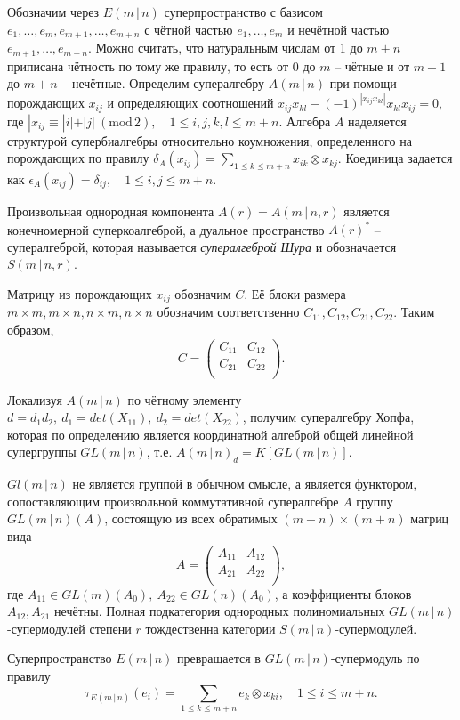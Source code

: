 
Обозначим через $ E(m\,|\,n) $ суперпространство с базисом $ e_1, \ldots, e_m, e_{m + 1}, \ldots, e_{m + n} $ 
с чётной частью $ e_1, \ldots, e_m $ и нечётной частью $ e_{m + 1}, \ldots, e_{m + n} $. 
Можно считать, что натуральным числам от 1 до $m + n$ приписана чётность по тому же правилу, то есть от 0 до $m$ -- чётные и от $m + 1$ до $m + n$ -- нечётные.
Определим супералгебру $ A(m\,|\,n) $ при помощи порождающих $x_{ij}$ и определяющих соотношений $x_{ij} x_{kl} - (-1)^{|x_{ij} x_{kl}|} x_{kl} x_{ij} = 0 $, 
где $ |x_{ij} \equiv |i| + |j| ~(\mbox{mod}\,2), \quad 1 \leqslant i, j, k, l \leqslant m + n $. 
Алгебра $A$ наделяется структурой супербиалгебры относительно коумножения, определенного на порождающих по правилу 
$ \delta_A (x_{ij}) = \sum\limits_{1 \leqslant k \leqslant m + n} x_{ik} \otimes x_{kj} $. 
Коединица задается как $ \epsilon_A (x_{ij}) = \delta_{ij}, \quad 1 \leqslant i, j \leqslant m + n $. 

Произвольная однородная компонента $ A(r) = A(m\,|\,n, r) $ является конечномерной суперкоалгеброй, а дуальное пространство $ A(r)^* $ -- супералгеброй, 
которая называется \textit{супералгеброй Шура} и обозначается $ S(m\,|\,n, r) $.

Матрицу из порождающих $x_{ij}$ обозначим $C$. Её блоки размера $ m \times m, m \times n, n \times m, n \times n $ обозначим соответственно 
$ C_{11}, C_{12}, C_{21}, C_{22} $. Таким образом,
$$ C = 
\begin{pmatrix}
C_{11} & C_{12} \\
C_{21} & C_{22} \\
\end{pmatrix}.
$$

Локализуя $ A(m\,|\,n) $ по чётному элементу $ d = d_1 d_2, \: d_1 = det(X_{11}), \: d_2 = det(X_{22}) $, получим супералгебру Хопфа, 
которая по определению является координатной алгеброй общей линейной супергруппы $ GL(m\,|\,n) $, т.е. $ A(m\,|\,n)_d = K[GL(m\,|\,n)] $.

$ Gl(m\,|\,n) $ не является группой в обычном смысле, а является функтором, сопоставляющим произвольной коммутативной супералгебре $A$
группу $ GL(m\,|\,n)(A) $, состоящую из всех обратимых $ (m + n) \times (m + n) $ матриц вида
$$ A = 
\begin{pmatrix}
A_{11} & A_{12} \\
A_{21} & A_{22} \\
\end{pmatrix},
$$
где $ A_{11} \in GL(m)(A_0), \: A_{22} \in GL(n)(A_0)$, а коэффициенты блоков $ A_{12}, A_{21} $ нечётны. 
Полная подкатегория однородных полиномиальных $GL(m\,|\,n)$-супермодулей степени $r$ тождественна категории 
$ S(m\,|\,n) $-супермодулей.

Суперпространство $ E(m\,|\,n) $ превращается в $GL(m\,|\,n)$-супермодуль по правилу 
$$
\tau_{E(m\,|\,n)}(e_i) = \sum \limits_{1 \leqslant k \leqslant m + n} e_k \otimes x_{ki}, \quad 1 \leqslant i \leqslant m + n.
$$
